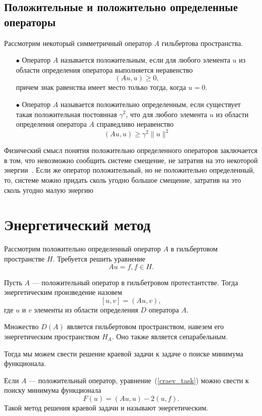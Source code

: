 \documentclass[12pt, a4paper]{article}
\begin{document}
\subsection{Положительные и положительно определенные операторы}
Рассмотрим некоторый симметричный оператор $A$ гильбертова пространства.
\begin{itemize}
	\item [$\bullet$]
Оператор $A$ называется положительным,
если для любого элемента $u$ из области определения оператора
выполняется неравенство
\[
(Au, u) \geqslant 0,
\]
причем знак равенства имеет место только тогда, когда $u = 0$.
\item [$\bullet$]
Оператор $A$ называется положительно определенным, если существует такая положительная постоянная $\gamma^2$, что для любого элемента $u$ из области определения оператора $A$ справедливо неравенство
\[\label{positive_definite_operator_1}
	(Au, u) \geqslant \gamma^2 \|u\|^2
\]
\end{itemize}

Физический смысл понятия положительно определенного
операторов заключается в том, что невозможно сообщить
системе смещение, не затратив на это некоторой энергии~\cite{michilin_smolskiy}. Если же оператор положительный, но не положительно
определенный, то, системе можно придать сколь угодно большое смещение, затратив на это сколь угодно малую энергию

\section{Энергетический метод}
Рассмотрим положительно определенный оператор $A$ в гильбертовом пространстве $H$. Требуется решить уравнение 
\begin{equation}
	\label{craev_task}
	Au = f, f \in H. 
\end{equation}

Пусть $A$ --- положительный оператор в гильбетровом протестантстве. Тогда энергетическим произведение назовем 
\[
	[u, v] = (Au, v),
\]
\noindent где $u$ и $v$ элементы из области определения $D$ оператора $A$. 

Множество $D(A)$ является гильбертовом пространством, навезем его энергетическим пространством $H_A$. Оно также является сепарабельным.

Тогда мы можем свести решение краевой задачи к задаче о поиске минимума функционала.

Если $A$ --- положительный оператор, уравнение~(\ref{craev_task}) можно свести к поиску минимума функционала
\begin{equation}
	\label{craev-min_task}
	F(u) = (Au, u) - 2(u, f).
\end{equation}
Такой метод решения краевой задачи и называют энергетическим.
\end{document}
